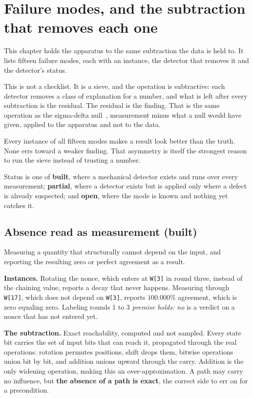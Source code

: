 \chapter{Failure modes, and the subtraction that removes each one}

This chapter holds the apparatus to the same subtraction the data is held to. It lists fifteen failure modes, each with an instance, the detector that removes it and the detector's status.

This is not a checklist. It is a sieve, and the operation is subtractive: each detector removes a class of explanation for a number, and what is left after every subtraction is the residual. The residual is the finding. That is the same operation as the sigma-delta null~\cite{src:Quigg-delta-null}, measurement minus what a null would have given, applied to the apparatus and not to the data.

Every instance of all fifteen modes makes a result look better than the truth. None errs toward a weaker finding. That asymmetry is itself the strongest reason to run the sieve instead of trusting a number.

Status is one of \textbf{built}, where a mechanical detector exists and runs over every measurement; \textbf{partial}, where a detector exists but is applied only where a defect is already suspected; and \textbf{open}, where the mode is known and nothing yet catches it.

\section{Absence read as measurement (built)}

Measuring a quantity that structurally cannot depend on the input, and reporting the resulting zero or perfect agreement as a result.

\textbf{Instances.} Rotating the nonce, which enters at \texttt{W[3]} in round three, instead of the chaining value, reports a decay that never happens. Measuring through \texttt{W[17]}, which does not depend on \texttt{W[3]}, reports \(100.000\%\) agreement, which is zero equaling zero. Labeling rounds 1 to 3 \emph{premise holds: no} is a verdict on a nonce that has not entered yet.

\textbf{The subtraction.} Exact reachability, computed and not sampled. Every state bit carries the set of input bits that can reach it, propagated through the real operations: rotation permutes positions, shift drops them, bitwise operations union bit by bit, and addition unions upward through the carry. Addition is the only widening operation, making this an over-approximation. A path may carry no influence, but \textbf{the absence of a path is exact}, the correct side to err on for a precondition.

